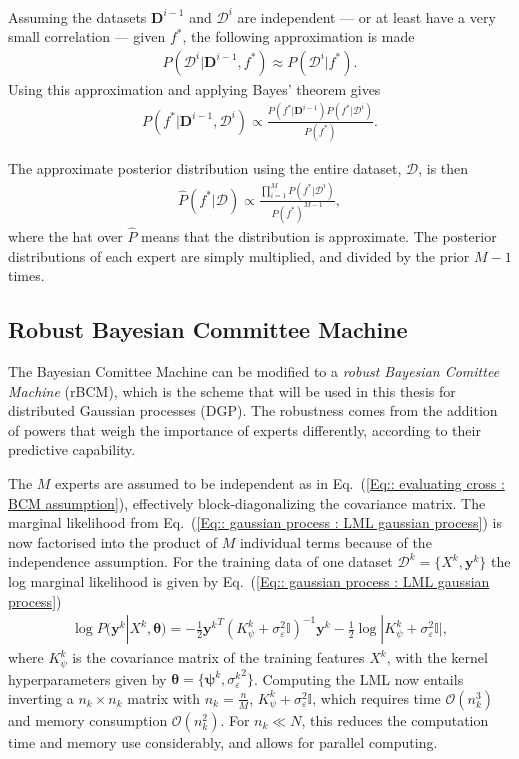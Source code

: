 \documentclass[twoside,english]{uiofysmaster}
\begin{document}
{{Assuming the datasets $\textbf{D}^{i-1}$ and $\mathcal{D}^i$ are independent --- or at least have a very small correlation --- given $f^*$, the following approximation is made
\begin{align}\label{Eq:: evaluating cross : BCM assumption}
P(\mathcal{D}^i | \textbf{D}^{i-1},f^*) \approx P(\mathcal{D}^i | f^*).
\end{align}
Using this approximation and applying Bayes' theorem gives
\begin{align}
P(f^* | \textbf{D}^{i-1}, \mathcal{D}^i) \propto \frac{P(f^*|\textbf{D}^{i-1}) P(f^* | \mathcal{D}^i)}{P(f^*)}. 
\end{align}

The approximate posterior distribution using the entire dataset, $\mathcal{D}$, is then 
\begin{align}\label{Eq:: evaluating cross : BCM predictive distribution}
\hat{P}(f^* | \mathcal{D}) \propto \frac{\prod_{i=1}^M P(f^*| \mathcal{D}^i)}{P(f^* )^{M-1}} ,
\end{align}
where the hat over $\hat{P}$ means that the distribution is approximate. The posterior distributions of each expert are simply multiplied, and divided by the prior $M-1$ times.

\subsection{Robust Bayesian Committee Machine}

The Bayesian Comittee Machine can be modified to a \textit{robust Bayesian Comittee Machine} (rBCM), which is the scheme that will be used in this thesis for distributed Gaussian processes (DGP). The robustness comes from the addition of powers that weigh the importance of experts differently, according to their predictive capability. 

The $M$ experts are assumed to be independent \cite{deisenroth2015distributed} as in Eq.~(\ref{Eq:: evaluating cross : BCM assumption}), effectively block-diagonalizing the covariance matrix. The marginal likelihood from Eq.~(\ref{Eq:: gaussian process : LML gaussian process}) is now factorised into the product of $M$ individual terms because of the independence assumption. For the training data of one dataset $\mathcal{D}^k = \{X^k, \textbf{y}^k \}$ the log marginal likelihood is given by Eq.~(\ref{Eq:: gaussian process : LML gaussian process})
\begin{align}
\log P(\textbf{y}^k|X^k, \boldsymbol{\theta}) = - \frac{1}{2} {\textbf{y}^k}^T (K_{\psi}^k + \sigma_{\varepsilon}^2 \mathbb{I})^{-1}\textbf{y}^k - \frac{1}{2} \log
 |K_{\psi}^k + \sigma_{\varepsilon}^2 \mathbb{I} |,
\end{align}
where $K_{\psi}^k$ is the covariance matrix of the training features $X^k$, with the kernel hyperparameters given by $\boldsymbol{\theta} = \{ \boldsymbol{\psi}^k, {\sigma_{\varepsilon}^k}^2 \}$. Computing the LML now entails inverting a $n_k \times n_k$ matrix with $n_k = \frac{n}{M}$, $K_{\psi}^{k} + \sigma_{\varepsilon}^2 \mathbb{I}$, which requires time $\mathcal{O}(n_k^3)$ and memory consumption $\mathcal{O}(n_k^2)$. For $n_k \ll N$, this reduces the computation time and memory use considerably, and allows for parallel computing. 

}}
\end{document}
